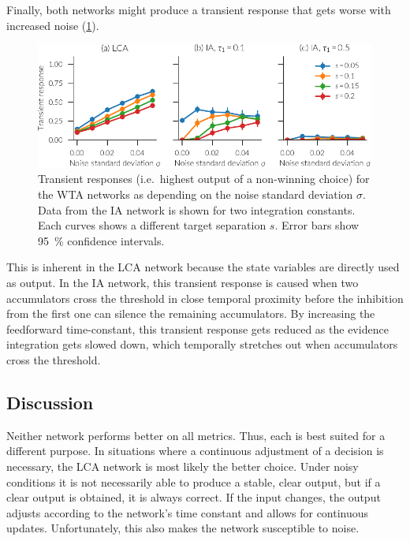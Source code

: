 Finally, both networks might produce a transient response that gets worse with increased noise (\cref{fig:ia-transient}).
\begin{figure}
    \centering
    \includegraphics{figures/ia-transient}
    \caption[Transient WTA responses.]{Transient responses (i.e.\ highest output of a non-winning choice) for the WTA networks as depending on the noise standard deviation $\sigma$. Data from the IA network is shown for two integration constants. Each curves shows a different target separation $s$. Error bars show \SI{95}{\percent} confidence intervals.}\label{fig:ia-transient}
\end{figure}
This is inherent in the LCA network because the state variables are directly used as output.
In the IA network, this transient response is caused when two accumulators cross the threshold in close temporal proximity before the inhibition from the first one can silence the remaining accumulators.
By increasing the feedforward time-constant, this transient response gets reduced as the evidence integration gets slowed down, which temporally stretches out when accumulators cross the threshold.


\subsection{Discussion}
Neither network performs better on all metrics.
Thus, each is best suited for a different purpose.
In situations where a continuous adjustment of a decision is necessary, the LCA network is most likely the better choice.
Under noisy conditions it is not necessarily able to produce a stable, clear output, but if a clear output is obtained, it is always correct.
If the input changes, the output adjusts according to the network's time constant and allows for continuous updates.
Unfortunately, this also makes the network susceptible to noise.

